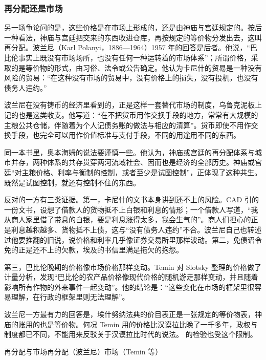 \subsubsection{再分配还是市场}
另一场争论问的是，这些价格是在市场上形成的，还是由神庙与宫廷规定的。按后一种看法，神庙与宫廷把交来的东西收进仓库，再按规定的等价物分发出去，这叫再分配。波兰尼（Karl Polanyi，1886—1964）1957 年的回答是后者。他说，“巴比伦事实上既没有市场场所，也没有任何一种运转着的市场体系”；所谓价格，采取的是等价物的形式，由习俗、法令或公告确定\cite{polanyi1957}。他认为卡尼什的贸易是一种没有风险的贸易：“在这种没有市场的贸易中，没有价格上的损失，没有投机，也没有债务人违约。”\cite{polanyi1957}

波兰尼在没有铸币的经济里看到的，正是这样一套替代市场的制度，乌鲁克泥板上记的也是这类收支。他写道：“在不把货币用作交换手段的地方，常常有大规模的主粮公共仓储，伴随着为个人记债务账的做法与相应的清算”。货币即使不用作交换手段，也完全可以用作价值标准与支付手段，不同的用途用不同的东西\cite{polanyi1957}。

同一本书里，奥本海姆的说法要谨慎一些。他认为，神庙或宫廷的再分配体系与城市并存，两种体系的共存贯穿两河流域社会、因而也是经济的全部历史。神庙或宫廷“对主粮价格、利率与衡制的控制，或者至少是试图控制”，正体现了这种共生\cite{polanyi1957}。既然是试图控制，就还有控制不住的东西。

反对的一方有三类证据。第一，卡尼什的文书本身讲到还不上的风险。CAD 引的一份文书，设想了借款人的货物抵不上白银和利息的情形；一个借款人写道，“我从商人家里借了带息的白银，要是利息涨得太多，我会生气的”\cite{cad_s}。商人们担心的正是利息越积越多、货物抵不上债，这与“没有债务人违约”不合。波兰尼自己也转述过他要推翻的旧说，说价格和利率几乎像证券交易所里那样波动\cite{polanyi1957}。第二，免债诏令免的正是还不上的欠款，埃及的书信里满是拖欠的抱怨。

第三，巴比伦晚期的价格像市场价格那样变动。Temin 对 Slotsky 整理的价格做了计量分析，发现“巴比伦的农产品价格像现代价格的随机游走那样变动，并且随着影响所有作物的外来事件一起变动”。他的结论是：“这些变化在市场的框架里很容易理解，在行政的框架里则无法理解”\cite{temin2003}。

波兰尼一方最有力的回答是，埃什努纳法典的价目表正是一张规定的等价物表，神庙的账用的也是等价物。何况 Temin 用的价格比汉谟拉比晚了一千多年，政权与制度都已不同，不能用来反驳关于汉谟拉比时代的说法。 的检验也受这个限制。

\begin{compare}{再分配与市场}{再分配（波兰尼）}{市场（Temin 等）}
\end{compare}

